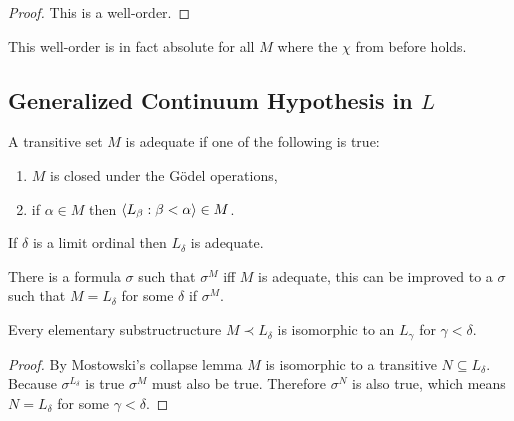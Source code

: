 \begin{theorem}
\begin{proof}
        This is a well-order.
    \end{proof}
\end{theorem}

This well-order is in fact absolute for all \(M\) where the \(\chi\) from before
holds.

\subsection{Generalized Continuum Hypothesis in \texorpdfstring{\(L\)}{L}}

\begin{definition}
    A transitive set \(M\) is adequate if one of the following is true:
    \begin{enumerate}
        \item \(M\) is closed under the Gödel operations,
        \item if \(\alpha\in M\) then \(\left<L_{\beta}:\beta<\alpha\right>\in
              M\).
    \end{enumerate}

    If \(\delta\) is a limit ordinal then \(L_{\delta}\) is adequate.

    There is a formula \(\sigma\) such that \(\sigma^{M}\) iff \(M\) is
    adequate, this can be improved to a \(\sigma\) such that \(M=L_{\delta}\)
    for some \(\delta\) if \(\sigma^{M}\).
\end{definition}

\begin{theorem}
    Every elementary substructructure \(M\prec L_{\delta}\) is isomorphic to an
    \(L_{\gamma}\) for \(\gamma<\delta\).

    \begin{proof}
        By Mostowski's collapse lemma \(M\) is isomorphic to a transitive
        \(N\subseteq L_{\delta}\). Because \(\sigma^{L_{\delta}}\) is true
        \(\sigma^{M}\) must also be true. Therefore \(\sigma^{N}\) is also true,
        which means \(N=L_{\delta}\) for some \(\gamma<\delta\).
    \end{proof}
\end{theorem}


